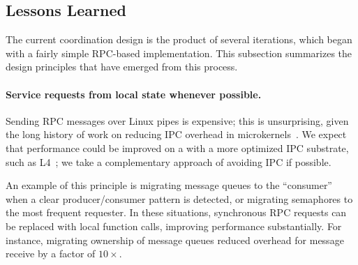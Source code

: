 

\subsection{Lessons Learned}
\label{sec:graphene:namespaces:insights}

The current coordination design is the product of several iterations, which began 
with a fairly simple RPC-based implementation. %
This subsection summarizes the design principles that have emerged from this process.

\paragraph{Service requests from local state whenever possible.}
Sending RPC messages over Linux pipes is expensive;
this is unsurprising, given the long history of 
work on reducing IPC overhead in microkernels~\citep{liedtke93sosp,chen93memory}.  
We expect that \sysname{} performance could be improved on a 
\microkernel{} with
a more optimized IPC substrate, such as L4~\citep{liedtke95sosp,klein09sel4,elphinstone13microkernels};
we take a complementary approach of avoiding IPC if possible.

An example of this principle is migrating message queues to the ``consumer'' when a 
clear producer/consumer pattern is detected, or migrating semaphores to the most frequent requester.
In these situations, synchronous RPC requests can be replaced with local function calls, improving
performance substantially.  For instance, migrating ownership of message queues 
reduced overhead for message receive by a factor of $10\times$.

